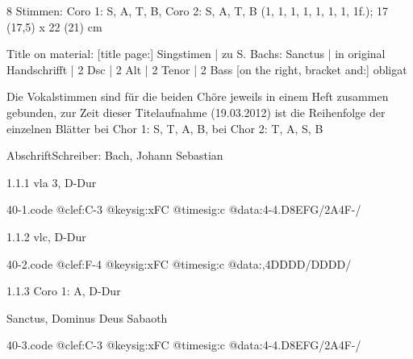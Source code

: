 \documentclass[a4paper, twocolumn, 11pt]{book}
\begin{document}
\par \textcolor{darkblue}{}  8 Stimmen: Coro 1: S, A, T, B, Coro 2: S, A, T, B  (1, 1, 1, 1, 1, 1, 1, 1f.); 17 (17,5) x 22 (21) cm\newline \begin{small} Title on material: [title page:] Singstimen | zu S. Bachs: Sanctus | in original Handschrifft | 2 Dsc | 2 Alt | 2 Tenor | 2 Bass [on the right, bracket and:] obligat\end{small} \newline \begin{small} Die Vokalstimmen sind für die beiden Chöre jeweils in einem Heft zusammen gebunden, zur Zeit dieser Titelaufnahme (19.03.2012) ist die Reihenfolge der einzelnen Blätter bei Chor 1: S, T, A, B, bei Chor 2: T, A, S, B\end{small} \newline Abschrift\newline Schreiber: Bach, Johann Sebastian
\par 1.1.1  vla 3, D-Dur  
\begin{filecontents*}{40-1.code}
@clef:C-3
@keysig:xFC
@timesig:c
@data:4-4.D{8EFG}/2A4F-/
\end{filecontents*}

\newline %
\par 1.1.2  vlc, D-Dur  
\begin{filecontents*}{40-2.code}
@clef:F-4
@keysig:xFC
@timesig:c
@data:,4DDDD/DDDD/
\end{filecontents*}

\newline %
\par 1.1.3  Coro 1: A, D-Dur\newline \begin{footnotesize} Sanctus, Dominus Deus Sabaoth \end{footnotesize}  
\begin{filecontents*}{40-3.code}
@clef:C-3
@keysig:xFC
@timesig:c
@data:4-4.D{8EFG}/2A4F-/
\end{filecontents*}
\end{document}
